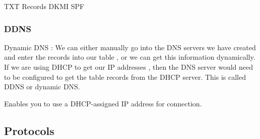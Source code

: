 TXT Records
DKMI
SPF


\subsubsectionend

\subsubsection{DDNS}
\label{sssec:ddns}

Dynamic DNS : We can either manually go into the DNS servers we have created and
enter the records into our table , or we can get this information dynamically. 
If we are using DHCP to get our IP addresses , then the DNS server would need to
be configured to get the table records from the DHCP server. This is called DDNS
or dynamic DNS.

 Enables you to use a DHCP-assigned IP address for connection.


\subsubsectionend


\subsectionend

\subsection{Protocols}
\label{ssec:protocols}


\subsectionend

\sectionend
